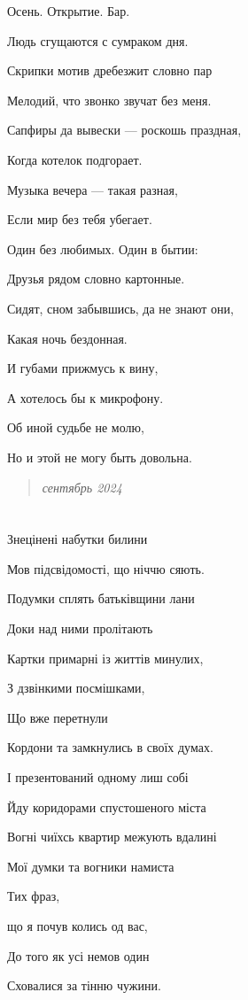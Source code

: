 \documentclass[
  a5paperpaper,
  DIV=11,
  numbers=noendperiod]{scrreprt}
\begin{document}
Осень. Открытие. Бар.

Людь сгущаются с сумраком дня.

Скрипки мотив дребезжит словно пар

Мелодий, что звонко звучат без меня.

Сапфиры да вывески --- роскошь праздная,

Когда котелок подгорает.

Музыка вечера --- такая разная,

Если мир без тебя убегает.

Один без любимых. Один в бытии:

Друзья рядом словно картонные.

Сидят, сном забывшись, да не знают они,

Какая ночь бездонная.

И губами прижмусь к вину,

А хотелось бы к микрофону.

Об иной судьбе не молю,

Но и этой не могу быть довольна.

\begin{quote}
\emph{сентябрь 2024}
\end{quote}

\section{}\label{section-21}

Знецінені набутки билини

Мов підсвідомості, що ніччю сяють.

Подумки сплять батьківщини лани

Доки над ними пролітають

Картки примарні із життів минулих,

З дзвінкими посмішками,

Що вже перетнули

Кордони та замкнулись в своїх думах.

І презентований одному лиш собі

Йду коридорами спустошеного міста

Вогні чиїхсь квартир межують вдалині

Мої думки та вогники намиста

Тих фраз,

що я почув колись од вас,

До того як усі немов один

Сховалися за тінню чужини.
\end{document}
